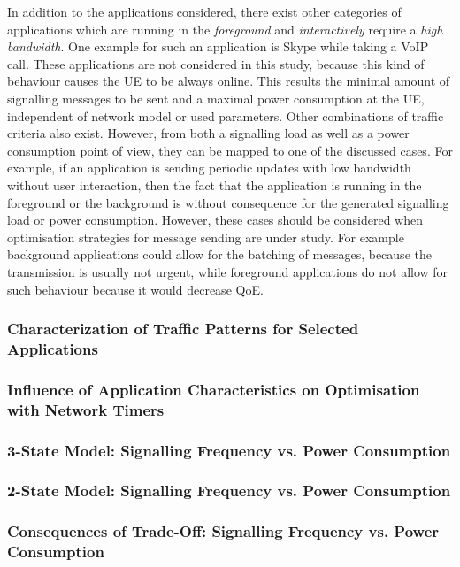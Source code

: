 In addition to the applications considered, there exist other categories of applications which are running in the \emph{foreground} and \emph{interactively} require a \emph{high bandwidth}.
One example for such an application is Skype while taking a \gls{VoIP} call.
These applications are not considered in this study, because this kind of behaviour causes the \gls{UE} to be always online.
This results the minimal amount of signalling messages to be sent and a maximal power consumption at the \gls{UE}, independent of network model or used parameters.
Other combinations of traffic criteria also exist.
However, from both a signalling load as well as a power consumption point of view, they can be mapped to one of the discussed cases.
For example, if an application is sending periodic updates with low bandwidth without user interaction, then the fact that the application is running in the foreground or the background is without consequence for the generated signalling load or power consumption.
However, these cases should be considered when optimisation strategies for message sending are under study.
For example background applications could allow for the batching of messages, because the transmission is usually not urgent, while foreground applications do not allow for such behaviour because it would decrease \gls{QoE}.


\subsubsection*{Characterization of Traffic Patterns for Selected Applications}\label{sec:network:network_traces:numerical_results:traffic_characterization}
\subsubsection*{Influence of Application Characteristics on Optimisation with Network Timers}\label{sec:network:network_traces:numerical_results:application_influence}
\subsubsection*{3-State Model: Signalling Frequency vs. Power Consumption}\label{sec:network:network_traces:numerical_results:three_states}
\subsubsection*{2-State Model: Signalling Frequency vs. Power Consumption}\label{sec:network:network_traces:numerical_results:two_states}
\subsubsection*{Consequences of Trade-Off: Signalling Frequency vs. Power Consumption}\label{sec:network:network_traces:numerical_results:trade_off}
